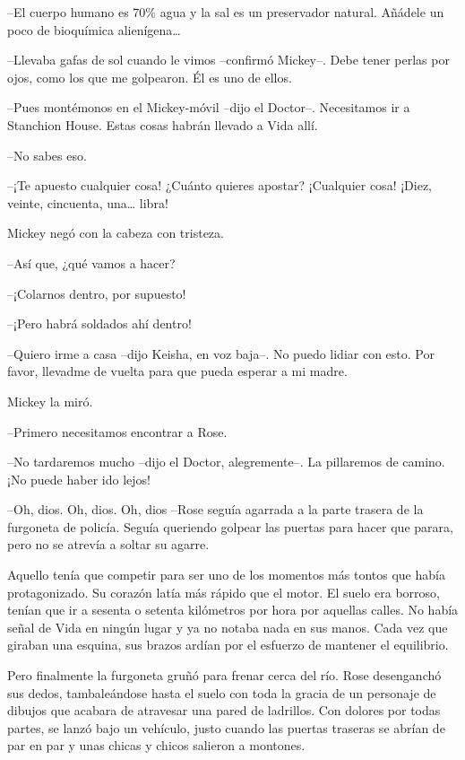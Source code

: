 {--El cuerpo humano es 70\% agua y la sal es un preservador natural.
 Añádele un poco de bioquímica alienígena\ldots{}}

{--Llevaba gafas de sol cuando le vimos --confirmó Mickey--. Debe tener
perlas por ojos, como los que me golpearon. Él es uno de ellos.}

{--Pues montémonos en el Mickey-móvil --dijo el Doctor--. Necesitamos ir
a Stanchion House. Estas cosas habrán llevado a Vida allí.}

{--No sabes eso.}

{--¡Te apuesto cualquier cosa! ¿Cuánto quieres apostar? ¡Cualquier cosa!
 ¡Diez, veinte, cincuenta, una\ldots{} libra!}

{Mickey negó con la cabeza con tristeza.}

{--Así que, ¿qué vamos a hacer?}

{--¡Colarnos dentro, por supuesto!}

{--¡Pero habrá soldados ahí dentro!}

{--Quiero irme a casa --dijo Keisha, en voz baja--. No puedo lidiar con
esto. Por favor, llevadme de vuelta para que pueda esperar a mi madre.}

{Mickey la miró.}

{--Primero necesitamos encontrar a Rose.}

{--No tardaremos mucho --dijo el Doctor, alegremente--. La pillaremos de
camino. ¡No puede haber ido lejos!}

\mbox{}

{--Oh, dios. Oh, dios. Oh, dios --Rose seguía agarrada a la parte
 trasera de la furgoneta de policía. Seguía queriendo golpear las puertas
para hacer que parara, pero no se atrevía a soltar su agarre.}

{Aquello tenía que competir para ser uno de los momentos más tontos que
 había protagonizado. Su corazón latía más rápido que el motor. El suelo
 era borroso, tenían que ir a sesenta o setenta kilómetros por hora por
 aquellas calles. No había señal de Vida en ningún lugar y ya no notaba
 nada en sus manos. Cada vez que giraban una esquina, sus brazos ardían
por el esfuerzo de mantener el equilibrio.}

{Pero finalmente la furgoneta gruñó para frenar cerca del río. Rose
 desenganchó sus dedos, tambaleándose hasta el suelo con toda la gracia
 de un personaje de dibujos que acabara de atravesar una pared de
 ladrillos. Con dolores por todas partes, se lanzó bajo un vehículo,
 justo cuando las puertas traseras se abrían de par en par y unas chicas
y chicos salieron a montones.}

